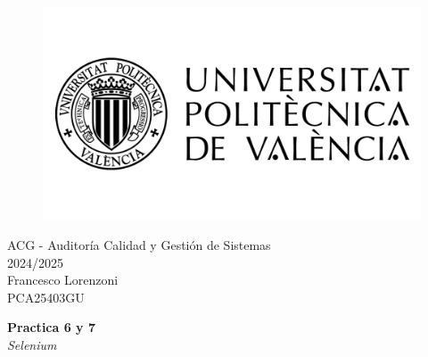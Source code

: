 \begin{titlepage}
   \begin{figure}
      \vspace{50mm}
       \centering
       \includegraphics[keepaspectratio=true,width=0.40\columnwidth]{images/upvLogo.png}
   \end{figure}
   
   \vspace{40mm}
   \begin{center}
       \LARGE{ACG - Auditoría Calidad y Gestión de Sistemas}
       \vspace{2.5mm}
       \\ \large{2024/2025}
       \vspace{5mm}
       \\ \large{Francesco Lorenzoni\\\textsc{PCA25403GU}}
   \end{center}
   
   \begin{center}
      \vspace{10mm}
       {\LARGE{\textbf{Practica 6 y 7}\\ \vspace{5mm}
       \textit{Selenium}}}
       
   \end{center}
\end{titlepage}
